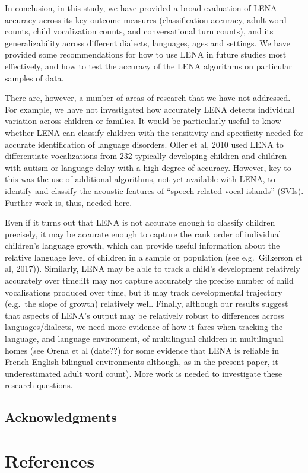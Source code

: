 \documentclass[english,floatsintext,man]{apa6}
\begin{document}
In conclusion, in this study, we have provided a broad evaluation of
LENA accuracy across its key outcome measures (classification accuracy,
adult word counts, child vocalization counts, and conversational turn
counts), and its generalizability across different dialects, languages,
ages and settings. We have provided some recommendations for how to use
LENA in future studies most effectively, and how to test the accuracy of
the LENA algorithms on particular samples of data.

There are, however, a number of areas of research that we have not
addressed. For example, we have not investigated how accurately LENA
detects individual variation across children or families. It would be
particularly useful to know whether LENA can classify children with the
sensitivity and specificity needed for accurate identification of
language disorders. Oller et al, 2010 used LENA to differentiate
vocalizations from 232 typically developing children and children with
autism or language delay with a high degree of accuracy. However, key to
this was the use of additional algorithms, not yet available with LENA,
to identify and classify the acoustic features of
\enquote{speech-related vocal islands} (SVIs). Further work is, thus,
needed here.

Even if it turns out that LENA is not accurate enough to classify
children precisely, it may be accurate enough to capture the rank order
of individual children's language growth, which can provide useful
information about the relative language level of children in a sample or
population (see e.g.~Gilkerson et al, 2017)). Similarly, LENA may be
able to track a child's development relatively accurately over time;iIt
may not capture accurately the precise number of child vocalisations
produced over time, but it may track developmental trajectory (e.g.~the
slope of growth) relatively well. Finally, although our results suggest
that aspects of LENA's output may be relatively robust to differences
across languages/dialects, we need more evidence of how it fares when
tracking the language, and language environment, of multilingual
children in multilingual homes (see Orena et al (date??) for some
evidence that LENA is reliable in French-English bilingual environments
although, as in the present paper, it underestimated adult word count).
More work is needed to investigate these research questions.

\subsection{Acknowledgments}\label{acknowledgments}

\newpage

\section{References}\label{references}

\setlength{\parindent}{-0.5in} \setlength{\leftskip}{0.5in}
\end{document}
